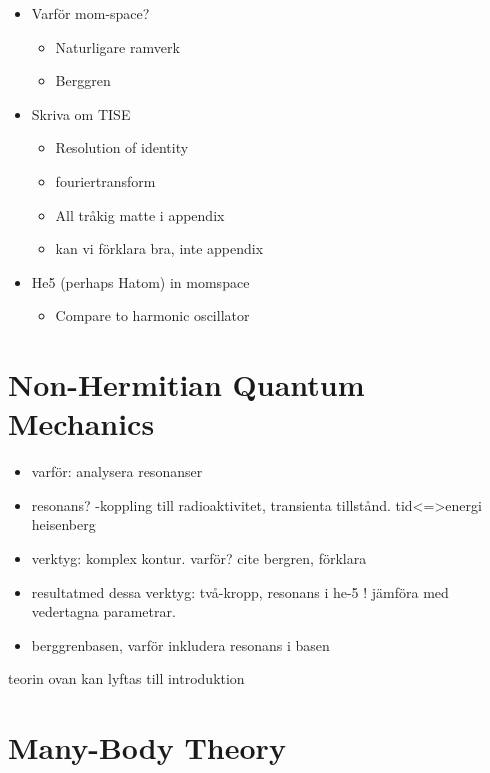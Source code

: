 \documentclass[12pt,a4paper]{report}
\begin{document}
\begin{itemize}
  \item Varför mom-space? 
  \begin{itemize}
    \item Naturligare ramverk
    \item Berggren
  \end{itemize}
  \item Skriva om TISE
  \begin{itemize}
    \item Resolution of identity
    \item fouriertransform
    \item All tråkig matte i appendix
    \item kan vi förklara bra, inte appendix
  \end{itemize}
  \item He5 (perhaps Hatom) in momspace
  \begin{itemize}
    \item Compare to harmonic oscillator
  \end{itemize}
\end{itemize}



\chapter{Non-Hermitian Quantum Mechanics} %
\label{cha:non_hermitian_quantum_mechanics}

\begin{itemize}
  \item varför: analysera resonanser
  \item resonans? -koppling till radioaktivitet, transienta tillstånd. tid<=>energi heisenberg
  \item verktyg: komplex kontur. varför? cite bergren, förklara 
  \item resultatmed dessa verktyg: två-kropp, resonans i he-5 ! jämföra med vedertagna parametrar. 
  \item berggrenbasen, varför inkludera resonans i basen
\end{itemize}
teorin ovan kan lyftas till introduktion


\chapter{Many-Body Theory} %
\label{cha:many_body_theory}
\end{document}
